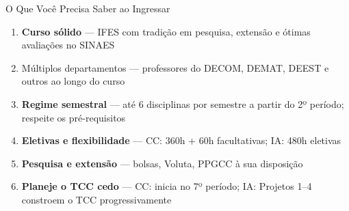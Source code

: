 \documentclass[aspectratio=169]{beamer}
\newcommand{\impt}[1]{\textcolor{morange}{\textbf{#1}}}
\newcommand{\ntc}[1]{\textcolor{mblue}{#1}}
\begin{document}
\begin{frame}{O Que Você Precisa Saber ao Ingressar}
  \begin{enumerate}\setlength\itemsep{5pt}
    \item \impt{Curso sólido} --- IFES com tradição em pesquisa, extensão e ótimas avaliações no SINAES
    \item \ntc{Múltiplos departamentos} --- professores do DECOM, DEMAT, DEEST e outros ao longo do curso
    \item \textbf{Regime semestral} --- até 6 disciplinas por semestre a partir do 2º período; respeite os pré-requisitos
    \item \textbf{Eletivas e flexibilidade} --- CC: 360h + 60h facultativas; IA: 480h eletivas
    \item \textbf{Pesquisa e extensão} --- bolsas, Voluta, PPGCC à sua disposição
    \item \textbf{Planeje o TCC cedo} --- CC: inicia no 7º período; IA: Projetos 1--4 constroem o TCC progressivamente
  \end{enumerate}
\end{frame}
\end{document}
